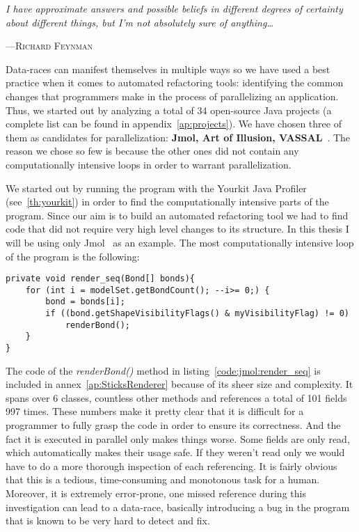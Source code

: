 \graphicspath{{content/analysis/figures/}}

\epigraph{\textit{I have approximate answers and possible beliefs in different
degrees of certainty about different things, but I'm not absolutely sure of
anything\ldots}}%
{---\textsc{Richard Feynman}} 

Data-races can manifest themselves in multiple ways so we have used a best
practice when it comes to automated refactoring tools: identifying the common
changes that programmers make in the process of parallelizing an application.
Thus, we started out by analyzing a total of 34 open-source Java projects (a
complete list can be found in appendix~\ref{ap:projects}). We have chosen three
of them as candidates for parallelization: \textbf{Jmol, Art of Illusion,
VASSAL}~\cite{Jmol-site, VASSAL-site, AOI-site}. The reason we chose so few is
because the other ones did not contain any computationally intensive loops in
order to warrant parallelization.


We started out by running the program with the Yourkit Java Profiler
(see~\ref{th:yourkit}) in order to find the computationally intensive parts of
the program. Since our aim is to build an automated refactoring tool we had to
find code that did not require very high level changes to its structure.
In this thesis I will be using only Jmol~\cite{Jmol-site} as an example. The
most computationally intensive loop of the program is the following:

\begin{lstlisting}[caption={Computationally intensive loop within the
SticksRenderer class}, label = {code:jmol:render_seq}]
private void render_seq(Bond[] bonds){
	for (int i = modelSet.getBondCount(); --i>= 0;) {
		bond = bonds[i];
		if ((bond.getShapeVisibilityFlags() & myVisibilityFlag) != 0)
			renderBond();
    }
}
\end{lstlisting}	

The code of the \emph{renderBond()} method in listing~\ref{code:jmol:render_seq}
is included in annex~\ref{ap:SticksRenderer} because of its sheer size and
complexity. It spans over 6 classes, countless other methods and references a
total of 101 fields 997 times. These numbers make it pretty clear that it is
difficult for a programmer to fully grasp the code in order to ensure its
correctness.
And the fact it is executed in parallel only makes things worse.
Some fields are only read, which automatically makes their usage safe. If they
weren't read only we would have to do a more thorough inspection of each
referencing. It is fairly obvious that this is a tedious, time-consuming and
monotonous task for a human. Moreover, it is extremely error-prone, one missed
reference during this investigation can lead to a data-race, basically
introducing a bug in the program that is known to be very hard to detect and
fix.

